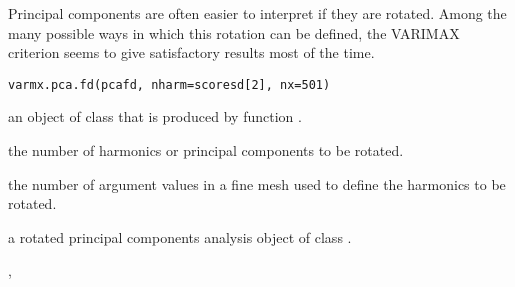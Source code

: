 \begin{Description}\relax
Principal components are often easier to interpret if they are
rotated.  Among the many possible ways in which this rotation can be
defined, the VARIMAX criterion seems to give satisfactory results most
of the time.
\end{Description}
\begin{Usage}
\begin{verbatim}
varmx.pca.fd(pcafd, nharm=scoresd[2], nx=501)
\end{verbatim}
\end{Usage}
\begin{Arguments}
\begin{ldescription}
\item[\code{pcafd}] an object of class  that is produced by function
.

\item[\code{nharm}] the number of harmonics or principal components to be
rotated.

\item[\code{nx}] the number of argument values in a fine mesh
used to define the harmonics to be
rotated.

\end{ldescription}
\end{Arguments}
\begin{Value}
a rotated principal components analysis object of class
.
\end{Value}
\begin{SeeAlso}\relax
{}, 
\end{SeeAlso}

